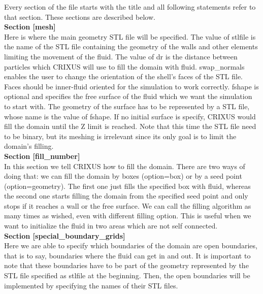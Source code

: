 \documentclass{../GPUSPHtemplate}
\begin{document}
Every section of the file starts with the title \cmd{[XXX]} 
and all following statements refer to that section.
These sections are described below.\\

\textbf{Section [mesh]}\\
Here is where the main geometry STL file will be specified. 
The value of stlfile is the name of the STL file containing 
the geometry of the walls and other elements limiting 
the movement of the fluid. 
The value of dr is the distance between particles 
which CRIXUS will use to fill the domain with fluid.
swap_normals enables the user to change the orientation 
of the shell’s faces of the STL file. Faces should be 
inner-fluid oriented for the simulation to work correctly.
fshape is optional and specifies the free surface of 
the fluid which we want the simulation to start with. 
The geometry of the surface has to be represented by a STL file, 
whose name is the value of fshape. If no initial surface is 
specify, CRIXUS would fill the domain until the Z limit 
is reached. Note that this time the STL file need to be binary, 
but its meshing is irrelevant since its only goal 
is to limit the domain’s filling.\\

\textbf{Section [fill\_number]}\\
In this section we tell CRIXUS how to fill the domain. 
There are two ways of doing that: we can fill the domain by boxes 
(option=box) or by a seed point (option=geometry).  The first one 
just fills the specified box with fluid, whereas the second 
one starts filling the domain from the specified seed point 
and only stops if it reaches a wall or the free surface. 
We can call the filling algorithm as many times as wished, 
even with different filling option. 
This is useful when we want to initialize the fluid 
in two areas which are not self connected. \\

\textbf{Section [special\_boundary\_grids]}\\
Here we are able to specify which boundaries of 
the domain are open boundaries, that is to say, 
boundaries where the fluid can get in and out. 
It is important to note that these boundaries have 
to be part of the geometry represented by the STL 
file specified as stlfile at the beginning. 
Then, the open boundaries will be implemented by specifying 
the names of their STL files.\\
\end{document}
